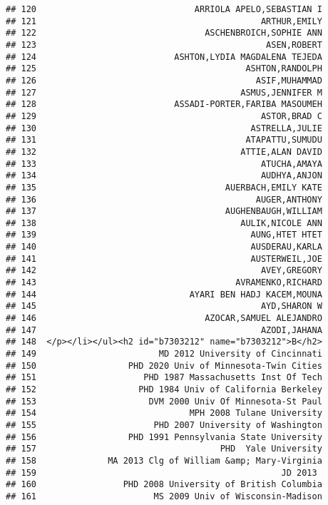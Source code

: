 \documentclass[
]{article}
\begin{document}
\begin{verbatim}
## 120                               ARRIOLA APELO,SEBASTIAN I
## 121                                            ARTHUR,EMILY
## 122                                 ASCHENBROICH,SOPHIE ANN
## 123                                             ASEN,ROBERT
## 124                           ASHTON,LYDIA MAGDALENA TEJEDA
## 125                                         ASHTON,RANDOLPH
## 126                                           ASIF,MUHAMMAD
## 127                                        ASMUS,JENNIFER M
## 128                           ASSADI-PORTER,FARIBA MASOUMEH
## 129                                            ASTOR,BRAD C
## 130                                          ASTRELLA,JULIE
## 131                                         ATAPATTU,SUMUDU
## 132                                        ATTIE,ALAN DAVID
## 133                                            ATUCHA,AMAYA
## 134                                            AUDHYA,ANJON
## 135                                     AUERBACH,EMILY KATE
## 136                                           AUGER,ANTHONY
## 137                                     AUGHENBAUGH,WILLIAM
## 138                                        AULIK,NICOLE ANN
## 139                                          AUNG,HTET HTET
## 140                                          AUSDERAU,KARLA
## 141                                          AUSTERWEIL,JOE
## 142                                            AVEY,GREGORY
## 143                                       AVRAMENKO,RICHARD
## 144                              AYARI BEN HADJ KACEM,MOUNA
## 145                                            AYD,SHARON W
## 146                                 AZOCAR,SAMUEL ALEJANDRO
## 147                                            AZODI,JAHANA
## 148  </p></li></ul><h2 id="b7303212" name="b7303212">B</h2>
## 149                        MD 2012 University of Cincinnati
## 150                  PHD 2020 Univ of Minnesota-Twin Cities
## 151                     PHD 1987 Massachusetts Inst Of Tech
## 152                    PHD 1984 Univ of California Berkeley
## 153                      DVM 2000 Univ Of Minnesota-St Paul
## 154                              MPH 2008 Tulane University
## 155                       PHD 2007 University of Washington
## 156                  PHD 1991 Pennsylvania State University
## 157                                    PHD  Yale University
## 158              MA 2013 Clg of William &amp; Mary-Virginia
## 159                                                JD 2013 
## 160                 PHD 2008 University of British Columbia
## 161                       MS 2009 Univ of Wisconsin-Madison

\end{verbatim}
\end{document}
